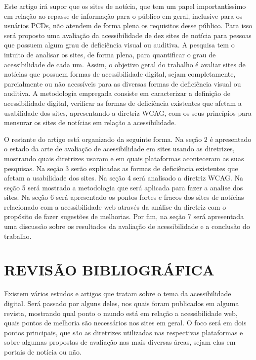 \documentclass[a4paper]{article}
\begin{document}
\begin{titlepage}
Este artigo irá supor que os sites de notícia, que tem um papel importantíssimo em relação ao repasse de informação para o público em geral, inclusive para os usuários PCDs, não atendem de forma plena os requisitos desse público. Para isso será proposto uma avaliação da acessibilidade de dez sites de notícia para pessoas que possuem algum grau de deficiência visual ou auditiva. A pesquisa tem o intuito de analisar os sites, de forma plena, para quantificar o grau de acessibilidade de cada um. Assim, o objetivo geral do trabalho é avaliar sites de notícias que possuem formas de acessibilidade digital, sejam completamente, parcialmente ou não acessíveis para as diversas formas de deficiência visual ou auditiva. A metodologia empregada consiste em caracterizar a definição de acessibilidade digital, verificar as formas de deficiência existentes que afetam a usabilidade dos sites, apresentando a diretriz WCAG, com os seus princípios para mensurar os sites de notícias em relação a acessibilidade.

O restante do artigo está organizado da seguinte forma. Na seção 2 é apresentado o estado da arte de avaliação de acessibilidade em sites usando as diretrizes, mostrando quais diretrizes usaram e em quais plataformas aconteceram as suas pesquisas. Na seção 3 serão explicadas as formas de deficiência existentes que afetam a usabilidade dos sites. Na seção 4 será analisado a diretriz WCAG. Na seção 5 será mostrado a metodologia que será aplicada para fazer a analise dos sites. Na seção 6 será apresentado os pontos fortes e fracos dos sites de notícias relacionado com a acessibilidade web através da análise da diretriz com o propósito de fazer sugestões de melhorias. Por fim, na seção 7 será apresentada uma discussão sobre os resultados da avaliação de acessibilidade e a conclusão do trabalho.

\section{REVISÃO BIBLIOGRÁFICA}
Existem vários estudos e artigos que tratam sobre o tema da acessibilidade digital. Será passado por alguns deles, nos quais foram publicados em alguma revista, mostrando qual ponto o mundo está em relação a acessibilidade web, quais pontos de melhoria são necessários nos sites em geral. O foco será em dois pontos principais, que são as diretrizes utilizadas nas respectivas plataformas e sobre algumas propostas de avaliação nas mais diversas áreas, sejam elas em portais de notícia ou não.


\end{titlepage}
\end{document}
